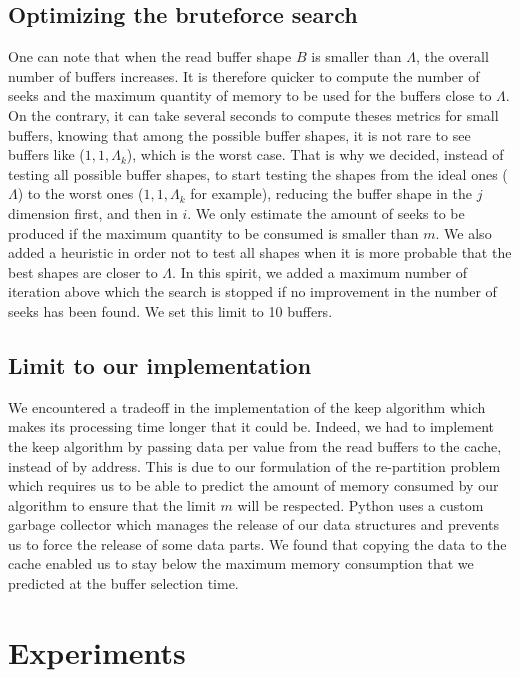 \documentclass[sigconf, nonacm]{acmart}
\begin{document}
{\subsection{Optimizing the bruteforce search}
One can note that when the read buffer shape $B$ is smaller than $\Lambda$,
the overall number of buffers increases.
It is therefore quicker to compute the number of seeks and the maximum
quantity of memory to be used for the buffers close to $\Lambda$.
On the contrary, it can take several seconds to compute theses metrics for
small buffers, knowing that among the possible buffer shapes, it is not rare to
see buffers like ($1,1,\Lambda_k$), which is the worst case.
That is why we decided, instead of testing all possible buffer shapes, to start
testing the shapes from the ideal ones ($\Lambda$) to the worst ones
($1,1,\Lambda_k$ for example), reducing the buffer shape in the $j$ dimension
first, and then in $i$.
We only estimate the amount of seeks to be produced if the maximum quantity
to be consumed is smaller than $m$.
We also added a heuristic in order not to test all shapes when it is more
probable that the best shapes are closer to $\Lambda$.
In this spirit, we added a maximum number of iteration above which the search
is stopped if no improvement in the number of seeks has been found.
We set this limit to 10 buffers.

\subsection{Limit to our implementation}
We encountered a tradeoff in the implementation of the keep algorithm which
makes its processing time longer that it could be.
Indeed, we had to implement the keep algorithm by passing data per value from
the read buffers to the cache, instead of by address.
This is due to our formulation of the re-partition problem which requires us to
be able to predict the amount of memory consumed by our algorithm to ensure that
the limit $m$ will be respected.
Python uses a custom garbage collector which manages the release of our
data structures and prevents us to force the release of some data parts.
We found that copying the data to the cache enabled us to stay below the
maximum memory consumption that we predicted at the buffer selection time.

\section{Experiments}

}
\end{document}

